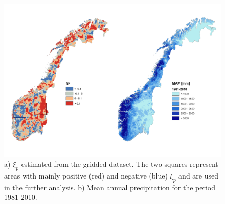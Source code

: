 \documentclass[12pt,a4paper,english]{article}
\begin{document}
\clearpage    

\begin{figure}[htbp]
\begin{minipage}[t]{0.98\textwidth}
\begin{center}
\includegraphics[width = \linewidth]{Figs/shape_grid.pdf} 
\vspace{-10mm}
\caption[shape]{\label{data:fig2}a) $\xi_{p}$ estimated from the gridded dataset. The two squares represent areas with mainly positive (red) and negative (blue) $\xi_{p}$ and are used in the further analysis. b) Mean annual precipitation for the period 1981-2010.}
\end{center}
\end{minipage}


\end{figure}
\end{document}
